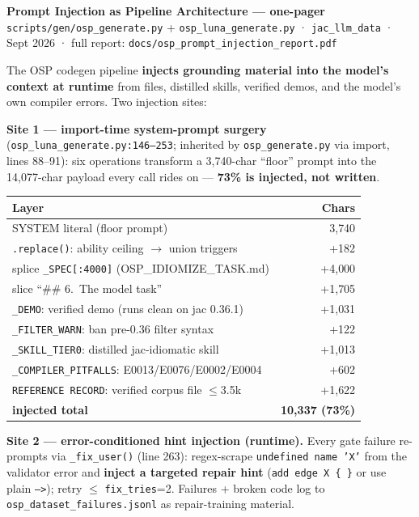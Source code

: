 \documentclass[10pt]{article}
\newcommand{\code}[1]{\texttt{\small #1}}
\newcommand{\file}[1]{\texttt{\small #1}}
\begin{document}
{\Large\bfseries Prompt Injection as Pipeline Architecture --- one-pager}\\[1pt]
{\small \file{scripts/gen/osp\_generate.py} + \file{osp\_luna\_generate.py} · \file{jac\_llm\_data} · Sept 2026 · full report: \file{docs/osp\_prompt\_injection\_report.pdf}}

\medskip
The OSP codegen pipeline \textbf{injects grounding material into the model's context at runtime} from files, distilled skills, verified demos, and the model's own compiler errors. Two injection sites:

\begin{minipage}[t]{0.52\textwidth}
\textbf{Site 1 --- import-time system-prompt surgery} (\file{osp\_luna\_generate.py:146--253}; inherited by \file{osp\_generate.py} via import, lines 88--91):
six operations transform a 3{,}740-char ``floor'' prompt into the 14{,}077-char payload every call rides on --- \textbf{73\% is injected, not written}.

\smallskip
{\small
\begin{tabular}{@{}lr@{}}
\toprule
\textbf{Layer} & \textbf{Chars}\\
\midrule
SYSTEM literal (floor prompt) & 3{,}740\\
\code{.replace()}: ability ceiling $\rightarrow$ union triggers & +182\\
splice \code{\_SPEC[:4000]} (OSP\_IDIOMIZE\_TASK.md) & +4{,}000\\
slice ``\#\# 6.\ The model task'' & +1{,}705\\
\code{\_DEMO}: verified demo (runs clean on jac 0.36.1) & +1{,}031\\
\code{\_FILTER\_WARN}: ban pre-0.36 filter syntax & +122\\
\code{\_SKILL\_TIER0}: distilled jac-idiomatic skill & +1{,}013\\
\code{\_COMPILER\_PITFALLS}: E0013/E0076/E0002/E0004 & +602\\
\code{REFERENCE RECORD}: verified corpus file $\le$3.5k & +1{,}622\\
\midrule
\textbf{injected total} & \textbf{10{,}337 (73\%)}\\
\bottomrule
\end{tabular}}

\smallskip
\textbf{Site 2 --- error-conditioned hint injection (runtime).} Every gate failure re-prompts via \code{\_fix\_user()} (line 263): regex-scrape \code{undefined name 'X'} from the validator error and \textbf{inject a targeted repair hint} (\code{add edge X \{ \}} or use plain \code{-->}); retry $\le$ \code{fix\_tries}=2. Failures + broken code log to \file{osp\_dataset\_failures.jsonl} as repair-training material.
\end{minipage}\hfill
\end{document}
